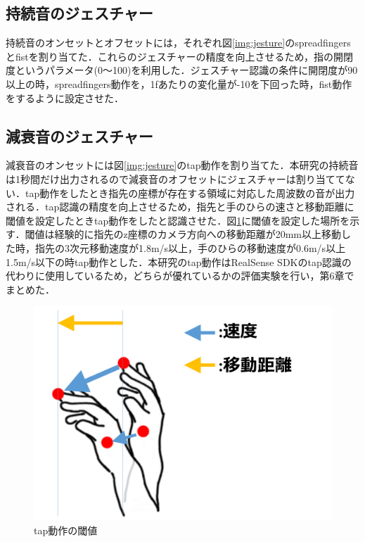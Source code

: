 \subsection{持続音のジェスチャー}
持続音のオンセットとオフセットには，それぞれ図\ref{img:jesture}のspreadfingersとfistを割り当てた．これらのジェスチャーの精度を向上させるため，指の開閉度というパラメータ(0〜100)を利用した．ジェスチャー認識の条件に開閉度が90以上の時，spreadfingers動作を，1fあたりの変化量が-10を下回った時，fist動作をするように設定させた．
\subsection{減衰音のジェスチャー}
減衰音のオンセットには図\ref{img:jesture}のtap動作を割り当てた．本研究の持続音は1秒間だけ出力されるので減衰音のオフセットにジェスチャーは割り当ててない．tap動作をしたとき指先の座標が存在する領域に対応した周波数の音が出力される．tap認識の精度を向上させるため，指先と手のひらの速さと移動距離に閾値を設定したときtap動作をしたと認識させた．図\ref{img:tap}に閾値を設定した場所を示す．閾値は経験的に指先のz座標のカメラ方向への移動距離が20mm以上移動した時，指先の3次元移動速度が1.8m/s以上，手のひらの移動速度が0.6m/s以上1.5m/s以下の時tap動作とした．本研究のtap動作はRealSense SDKのtap認識の代わりに使用しているため，どちらが優れているかの評価実験を行い，第6章でまとめた．
\begin{figure}[t]
	\begin{center}
		\includegraphics[width=1\linewidth]{assets/img/tap.png}
		\caption{tap動作の閾値}
		\label{img:tap}
	\end{center}
\end{figure}
